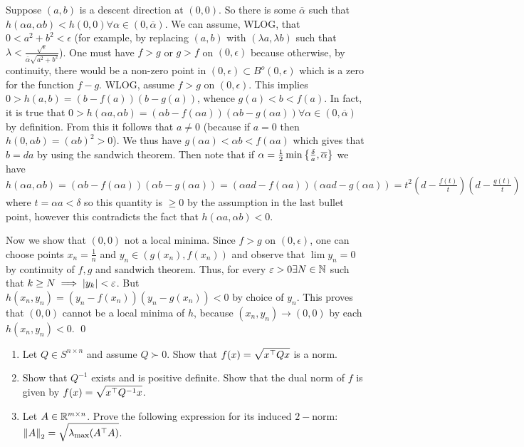 \begin{pf}
Suppose $(a,b)$ is a descent direction at $(0,0)$. So there is some $\overline\alpha$ such that $h(\alpha a,\alpha b) < h(0,0) \forall \alpha\in(0,\overline\alpha)$. We can assume, WLOG, that $0<a^2+b^2<\epsilon$ (for example, by replacing $(a,b)$ with $(\lambda a, \lambda b)$ such that $\lambda<\frac{\sqrt\epsilon}{\overline \alpha\sqrt{a^2+b^2}}$). One must have $f>g$ or $g>f$ on $(0,\epsilon)$ because otherwise, by continuity, there would be a non-zero point in $(0,\epsilon)\subset B^o(0,\epsilon)$ which is a zero for the function $f-g$. WLOG, assume $f>g$ on $(0,\epsilon)$. This implies $0 > h(a,b) = (b-f(a))(b-g(a))$, whence $g(a) < b < f(a)$. In fact, it is true that $0>h(\alpha a, \alpha b) = (\alpha b-f(\alpha a))(\alpha b-g(\alpha a))\forall \alpha\in (0,\overline \alpha)$ by definition. From this it follows that $a\neq 0$ (because if $a=0$ then $h(0,\alpha b) = (\alpha b)^2 > 0$). We thus have $g(\alpha a)<\alpha b < f(\alpha a)$ which gives that $b = da$ by using the sandwich theorem. Then note that if $\alpha = \frac{1}{2}\min\left\{\frac{\delta}{a},\overline \alpha\right\}$ we have $h(\alpha a, \alpha b) = (\alpha b-f(\alpha a))(\alpha b - g(\alpha a)) = (\alpha ad-f(\alpha a))(\alpha ad - g(\alpha a)) = t^2 \left(d-\frac{f(t)}{t}\right) \left(d-\frac{g(t)}{t}\right)$ where $t = \alpha a < \delta$ so this quantity is $\ge0$ by the assumption in the last bullet point, however this contradicts the fact that $h(\alpha a, \alpha b) < 0$.

Now we show that $(0,0)$ not a local minima. Since $f>g$ on $(0,\epsilon)$, one can choose points $x_n=\frac{1}{n}$ and $y_n\in (g(x_n),f(x_n))$ and observe that $\lim y_n = 0$ by continuity of $f,g$ and sandwich theorem. Thus, for every $\varepsilon>0\exists N\in \mathbb{N}$ such that $k\geq N\implies \left| y_k \right| < \varepsilon$. But $h(x_n,y_n) = (y_n-f(x_n))(y_n-g(x_n)) < 0$ by choice of $y_n$. This proves that $(0,0)$ cannot be a local minima of $h$, because $(x_n,y_n)\to (0,0)$ by each $h(x_n,y_n)<0$.
\qed\end{pf}





\newpage
\pb
\begin{enumerate}[leftmargin=*]
\item Let $Q\in S^{n\times n}$ and assume $Q\succ 0$. Show that $\displaystyle f(x) = \sqrt{x^\top Qx}$ is a norm.
\item Show that $Q^{-1}$ exists and is positive definite. Show that the dual norm of $f$ is given by $\displaystyle f(x) = \sqrt{x^\top Q^{-1}x}$.
\item Let $A \in\mathbb{R}^{m\times n}$. Prove the following expression for its induced $2-$norm: $\displaystyle\left\lVert A \right\rVert_{2} = \sqrt{\lambda_{\max}(A^\top A)}$.
\end{enumerate}

